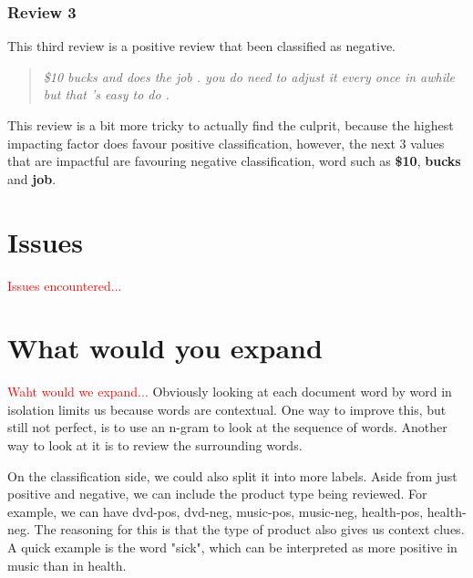 \documentclass[runningheads]{llncs}
\begin{document}
    \subsubsection{Review 3}
    This third review is a positive review that been classified as negative.
    \begin{quotation}
        \textit{\$10 bucks and does the job . you do need to adjust it every once in awhile but that 's easy to do .}
    \end{quotation}
    This review is a bit more tricky to actually find the culprit, because the highest impacting factor does favour positive classification, however, the next 3 values that are impactful are favouring negative classification, word such as \textbf{\$10}, \textbf{bucks} and \textbf{job}.
    
    \section{Issues}
    \textcolor{red}{Issues encountered...}
    \section{What would you expand}
    \textcolor{red}{Waht would we expand...}
    Obviously looking at each document word by word in isolation limits us because words are contextual. One way to improve this, but still not perfect, is to use an n-gram to look at the sequence of words. Another way to look at it is to review the surrounding words.

    On the classification side, we could also split it into more labels. Aside from just positive and negative, we can include the product type being reviewed. For example, we can have dvd-pos, dvd-neg, music-pos, music-neg, health-pos, health-neg. The reasoning for this is that the type of product also gives us context clues. A quick example is the word "sick", which can be interpreted as more positive in music than in health.
    
    
    
\end{document}
